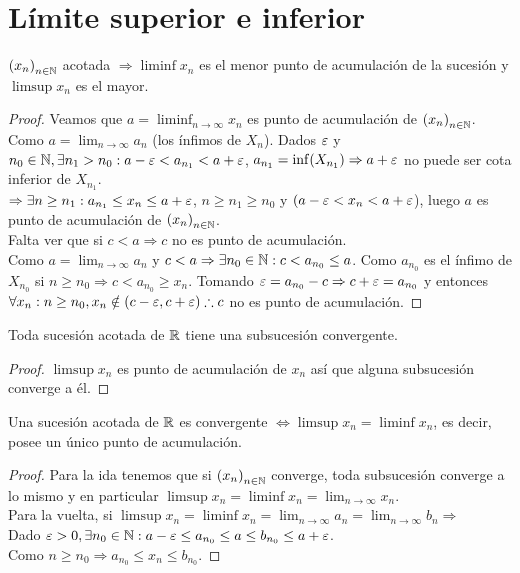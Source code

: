 \section{Límite superior e inferior}

\begin{theorem}
  \({(x_n)}_{n \in \mathbb{N}} \) acotada \(\Rightarrow \liminf x_n\) es el menor punto de acumulación de la sucesión y \(\limsup x_n\) es el mayor.

  \begin{proof}
    Veamos que \(a = \liminf_{n \to \infty} x_n\) es punto de acumulación de \({(x_n)}_{n \in \mathbb{N}} \). \\
    Como \(a = \lim_{n \to \infty} a_n\) (los ínfimos de \(X_n\)). Dados \(\varepsilon \) y \(n_0 \in \mathbb{N}, \exists n_1 > n_0 : a-\varepsilon < a_{n_1} < a+\varepsilon \), \(a_{n_1} = \inf(X_{n_1}) \Rightarrow a + \varepsilon \) no puede ser cota inferior de \(X_{n_1} \). \\
    \(\Rightarrow \exists n \geq n_1 : a_{n_1} \leq x_n \leq a+\varepsilon \), \( n \geq n_1 \geq n_0\) y \((a - \varepsilon < x_n < a + \varepsilon \)), luego \(a\) es punto de acumulación de \({(x_n)}_{n \in \mathbb{N}} \). \\
    Falta ver que si \(c < a \Rightarrow c\) no es punto de acumulación. \\
    Como \(a = \lim_{n \to \infty} a_n\) y \(c < a \Rightarrow \exists n_0 \in \mathbb{N} : c < a_{n_0} \leq a\). Como \(a_{n_0} \) es el ínfimo de \(X_{n_0} \) si \(n \geq n_0 \Rightarrow c < a_{n_0} \geq x_n\). Tomando \(\varepsilon = a_{n_0} - c \Rightarrow c+\varepsilon = a_{n_0} \) y entonces \(\forall x_n: n \geq n_0, x_n \notin (c - \varepsilon, c + \varepsilon) \therefore c\) no es punto de acumulación.
  \end{proof}
\end{theorem}

\begin{theorem}
  Toda sucesión acotada de \(\mathbb{R} \) tiene una subsucesión convergente.
  \begin{proof}
    \(\limsup x_n\) es punto de acumulación de \(x_n\) así que alguna subsucesión converge a él.
  \end{proof}
\end{theorem}

\begin{corollary}
  Una sucesión acotada de \(\mathbb{R} \) es convergente \(\iff \limsup x_n = \liminf x_n\), es decir, posee un único punto de acumulación.
  \begin{proof}
    Para la ida tenemos que si \({(x_n)}_{n \in \mathbb{N}} \) converge, toda subsucesión converge a lo mismo y en particular \(\limsup x_n = \liminf x_n = \lim_{n \to \infty} x_n\). \\
    Para la vuelta, si \(\limsup x_n = \liminf x_n = \lim_{n \to \infty} a_n = \lim_{n \to \infty} b_n \Rightarrow \) \\
    Dado \(\varepsilon > 0, \exists n_0 \in \mathbb{N} : a - \varepsilon \leq a_{n_0} \leq a \leq b_{n_0} \leq a + \varepsilon \). \\
    Como \(n \geq n_0 \Rightarrow a_{n_0} \leq x_n \leq b_{n_0} \).
  \end{proof}
\end{corollary}

